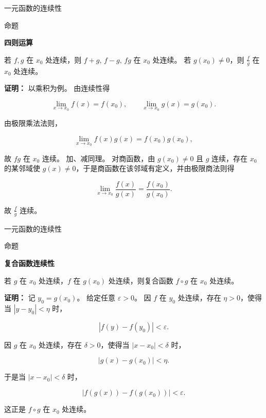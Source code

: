 \documentclass[aspectratio=169,10pt,fontset=fandol]{ctexbeamer}
\begin{document}
\begin{frame}[t,fragile]{一元函数的连续性}
\small
\begin{block}{命题}
{\small
\textbf{四则运算}\par


若 $f,g$ 在 $x_0$ 处连续，则 $f+g,\,f-g,\,fg$ 在 $x_0$ 处连续。 若 $g(x_0)\neq0$，则 $\frac{f}{g}$ 在 $x_0$ 处连续。


}
\end{block}
\pause
{\small
\textbf{证明：}
以乘积为例。 由连续性得

\[

\lim_{x\to x_0}f(x)=f(x_0),\qquad \lim_{x\to x_0}g(x)=g(x_0).

\]

由极限乘法法则，

\[

\lim_{x\to x_0}f(x)g(x)=f(x_0)g(x_0),

\]

故 $fg$ 在 $x_0$ 连续。 加、减同理。 对商函数，由 $g(x_0)\neq0$ 且 $g$ 连续，存在 $x_0$ 的某邻域使 $g(x)\neq0$，于是商函数在该邻域有定义，并由极限商法则得

\[

\lim_{x\to x_0}\frac{f(x)}{g(x)}=\frac{f(x_0)}{g(x_0)}.

\]

故 $\frac{f}{g}$ 连续。


}
\end{frame}
\begin{frame}[t,fragile]{一元函数的连续性}
\small
\begin{block}{命题}
{\small
\textbf{复合函数连续性}\par


若 $g$ 在 $x_0$ 处连续，$f$ 在 $g(x_0)$ 处连续，则复合函数 $f\circ g$ 在 $x_0$ 处连续。


}
\end{block}
\pause
{\small
\textbf{证明：}
记 $y_0=g(x_0)$。 给定任意 $\varepsilon>0$。 因 $f$ 在 $y_0$ 处连续，存在 $\eta>0$，使得当 $|y-y_0|<\eta$ 时，

\[

|f(y)-f(y_0)|<\varepsilon.

\]

因 $g$ 在 $x_0$ 处连续，存在 $\delta>0$，使得当 $|x-x_0|<\delta$ 时，

\[

|g(x)-g(x_0)|<\eta.

\]

于是当 $|x-x_0|<\delta$ 时，

\[

|f(g(x))-f(g(x_0))|<\varepsilon.

\]

这正是 $f\circ g$ 在 $x_0$ 处连续。


}
\end{frame}
\end{document}
